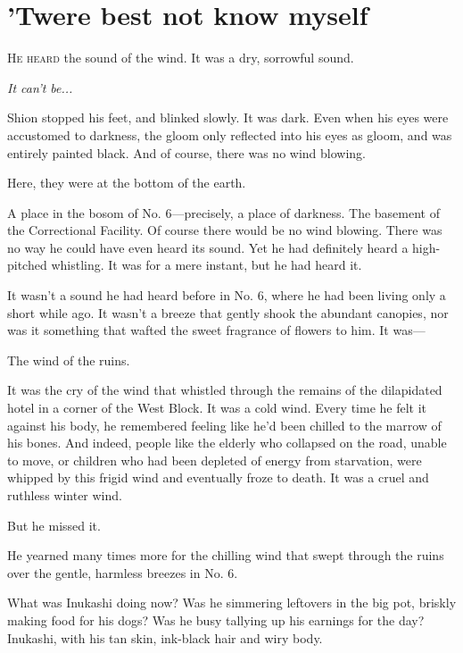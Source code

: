 
\chapter{'Twere best not know myself}


\lettrine{H}{e heard} the sound of the wind. It was a dry, sorrowful sound.

\emph{It can't be...}

Shion stopped his feet, and blinked slowly. It was dark. Even when his
eyes were accustomed to darkness, the gloom only reflected into his eyes
as gloom, and was entirely painted black. And of course, there was no
wind blowing.

Here, they were at the bottom of the earth.

A place in the bosom of No. 6---precisely, a place of darkness. The
basement of the Correctional Facility. Of course there would be no wind
blowing. There was no way he could have even heard its sound. Yet he had
definitely heard a high-pitched whistling. It was for a mere instant,
but he had heard it.

It wasn't a sound he had heard before in No. 6, where he had been living
only a short while ago. It wasn't a breeze that gently shook the
abundant canopies, nor was it something that wafted the sweet fragrance
of flowers to him. It was---

The wind of the ruins.

It was the cry of the wind that whistled through the remains of the
dilapidated hotel in a corner of the West Block. It was a cold wind.
Every time he felt it against his body, he remembered feeling like he'd
been chilled to the marrow of his bones. And indeed, people like the
elderly who collapsed on the road, unable to move, or children who had
been depleted of energy from starvation, were whipped by this frigid
wind and eventually froze to death. It was a cruel and ruthless winter
wind.

But he missed it.

He yearned many times more for the chilling wind that swept through the
ruins over the gentle, harmless breezes in No. 6.

What was Inukashi doing now? Was he simmering leftovers in the big pot,
briskly making food for his dogs? Was he busy tallying up his earnings
for the day? Inukashi, with his tan skin, ink-black hair and wiry body.

